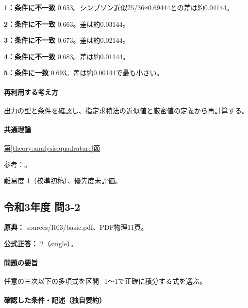 \noindent\textbf{1：条件に不一致} 0.653。シンプソン近似25/36≈0.69444との差は約0.04144。\par

\noindent\textbf{2：条件に不一致} 0.663。差は約0.03144。\par

\noindent\textbf{3：条件に不一致} 0.673。差は約0.02144。\par

\noindent\textbf{4：条件に不一致} 0.683。差は約0.01144。\par

\noindent\textbf{5：条件に一致} 0.693。差は約0.00144で最も小さい。\par

\paragraph{再利用する考え方} 出力の型と条件を確認し、指定求積法の近似値と厳密値の定義から再計算する。

\paragraph{共通理論} \hyperref[theory:analysis:quadrature]{第\ref*{theory:analysis:quadrature}節}

\par 参考：\cite{nist_quadrature}。

\par 難易度 1（校準初稿）、優先度未評価。

\subsection{令和3年度 問3-2}
\label{q:r03-reg-basic-3-2}

\noindent\textbf{原典：} sources/R03/basic.pdf、PDF物理11頁。

\textbf{公式正答：} 2（single）。

\paragraph{問題の要旨} 任意の三次以下の多項式を区間−1〜1で正確に積分する式を選ぶ。

\paragraph{確認した条件・記述（独自要約）}\mbox{}\par

